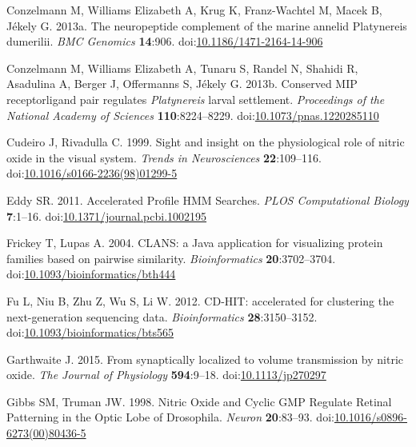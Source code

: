 \documentclass[
  10pt,
  onecolumn]{article}
\newlength{\cslhangindent}
\newlength{\cslentryspacingunit} %
\newenvironment{CSLReferences}[2] %
 {%
  \setlength{\parindent}{0pt}
  \ifodd #1
  \let\oldpar\par
  \def\par{\hangindent=\cslhangindent\oldpar}
  \fi
  \setlength{\parskip}{#2\cslentryspacingunit}
 }%
 {}
\begin{document}
\begin{CSLReferences}{1}{0}
\leavevmode{}%
Conzelmann M, Williams Elizabeth A, Krug K, Franz-Wachtel M, Macek B,
Jékely G. 2013a. The neuropeptide complement of the marine annelid
Platynereis dumerilii. \emph{BMC Genomics} \textbf{14}:906.
doi:\href{https://doi.org/10.1186/1471-2164-14-906}{10.1186/1471-2164-14-906}

\leavevmode{}%
Conzelmann M, Williams Elizabeth A, Tunaru S, Randel N, Shahidi R,
Asadulina A, Berger J, Offermanns S, Jékely G. 2013b. Conserved MIP
receptor{\textendash}ligand pair regulates {\emph{Platynereis}} larval
settlement. \emph{Proceedings of the National Academy of Sciences}
\textbf{110}:8224--8229.
doi:\href{https://doi.org/10.1073/pnas.1220285110}{10.1073/pnas.1220285110}

\leavevmode{}%
Cudeiro J, Rivadulla C. 1999. Sight and insight {\textendash} on the
physiological role of nitric oxide in the visual system. \emph{Trends in
Neurosciences} \textbf{22}:109--116.
doi:\href{https://doi.org/10.1016/s0166-2236(98)01299-5}{10.1016/s0166-2236(98)01299-5}

\leavevmode{}%
Eddy SR. 2011. Accelerated Profile HMM Searches. \emph{PLOS
Computational Biology} \textbf{7}:1--16.
doi:\href{https://doi.org/10.1371/journal.pcbi.1002195}{10.1371/journal.pcbi.1002195}

\leavevmode{}%
Frickey T, Lupas A. 2004. CLANS: a Java application for visualizing
protein families based on pairwise similarity. \emph{Bioinformatics}
\textbf{20}:3702--3704.
doi:\href{https://doi.org/10.1093/bioinformatics/bth444}{10.1093/bioinformatics/bth444}

\leavevmode{}%
Fu L, Niu B, Zhu Z, Wu S, Li W. 2012. CD-HIT: accelerated for clustering
the next-generation sequencing data. \emph{Bioinformatics}
\textbf{28}:3150--3152.
doi:\href{https://doi.org/10.1093/bioinformatics/bts565}{10.1093/bioinformatics/bts565}

\leavevmode{}%
Garthwaite J. 2015. From synaptically localized to volume transmission
by nitric oxide. \emph{The Journal of Physiology} \textbf{594}:9--18.
doi:\href{https://doi.org/10.1113/jp270297}{10.1113/jp270297}

\leavevmode{}%
Gibbs SM, Truman JW. 1998. Nitric Oxide and Cyclic GMP Regulate Retinal
Patterning in the Optic Lobe of Drosophila. \emph{Neuron}
\textbf{20}:83--93.
doi:\href{https://doi.org/10.1016/s0896-6273(00)80436-5}{10.1016/s0896-6273(00)80436-5}


\end{CSLReferences}
\end{document}
